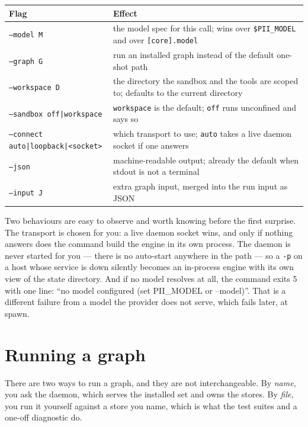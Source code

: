 \begin{longtable}{@{}p{}p{}@{}}
	\toprule
	\textbf{Flag} & \textbf{Effect} \\
	\midrule
	\endhead
	\texttt{--model M} & the model spec for this call; wins over \texttt{\$PII\_MODEL} and
	over \texttt{[core].model} \\
	\texttt{--graph G} & run an installed graph instead of the default one-shot path \\
	\texttt{--workspace D} & the directory the sandbox and the tools are scoped to;
	defaults to the current directory \\
	\texttt{--sandbox off|workspace} & \texttt{workspace} is the default; \texttt{off}
	runs unconfined and says so \\
        \texttt{--connect auto|loopback|\textless{}socket\textgreater{}} & which transport to
use; \texttt{auto} takes
	a live daemon socket if one answers \\
	\texttt{--json} & machine-readable output; already the default when stdout is not a
	terminal \\
	\texttt{--input J} & extra graph input, merged into the run input as JSON \\
	\bottomrule
\end{longtable}

Two behaviours are easy to observe and worth knowing before the first surprise. The
transport is chosen for you: a live daemon socket wins, and only if nothing answers does
the command build the engine in its own process. The daemon is never started for you ---
there is no auto-start anywhere in the path --- so a \texttt{-p} on a host whose service is
down silently becomes an in-process engine with its own view of the state directory. And
if no model resolves at all, the command exits 5 with one line:
\enquote{no model configured (set PII\_MODEL or --model)}. That is a different failure from
a model the provider does not serve, which fails later, at spawn.

\section{Running a graph}

There are two ways to run a graph, and they are not interchangeable. By \emph{name}, you
ask the daemon, which serves the installed set and owns the stores. By \emph{file}, you run
it yourself against a store you name, which is what the test suites and a one-off
diagnostic do.

